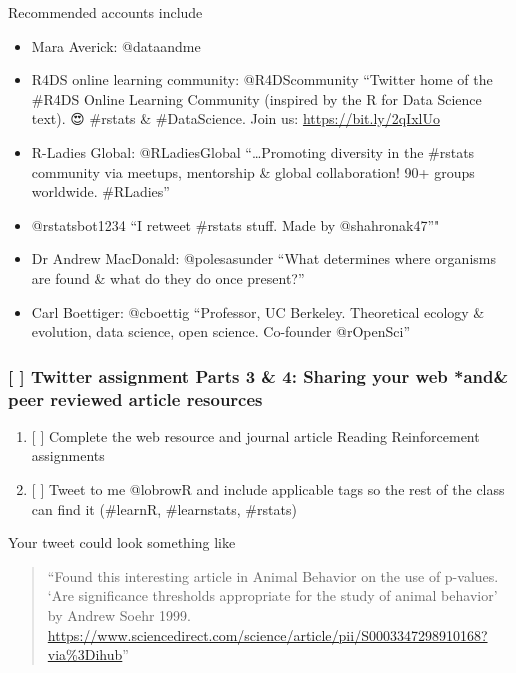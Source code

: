 \documentclass[]{article}
\providecommand{\tightlist}{%
  \setlength{\itemsep}{0pt}\setlength{\parskip}{0pt}}
\begin{document}
Recommended accounts include

\begin{itemize}
\tightlist
\item
  Mara Averick: @dataandme
\item
  R4DS online learning community: @R4DScommunity ``Twitter home of the
  \#R4DS Online Learning Community (inspired by the R for Data Science
  text). 😍 \#rstats \& \#DataScience. Join us:
  \url{https://bit.ly/2qIxlUo}
\item
  R-Ladies Global: @RLadiesGlobal ``\ldots{}Promoting diversity in the
  \#rstats community via meetups, mentorship \& global collaboration!
  90+ groups worldwide. \#RLadies''
\item
  @rstatsbot1234 ``I retweet \#rstats stuff. Made by @shahronak47''"
\item
  Dr Andrew MacDonald: @polesasunder ``What determines where organisms
  are found \& what do they do once present?''
\item
  Carl Boettiger: @cboettig ``Professor, UC Berkeley. Theoretical
  ecology \& evolution, data science, open science. Co-founder
  @rOpenSci''
\end{itemize}

\subsubsection{{[} {]} Twitter assignment Parts 3 \& 4: Sharing your web
*and\& peer reviewed article
resources}\label{twitter-assignment-parts-3-4-sharing-your-web-and-peer-reviewed-article-resources}

\begin{enumerate}
\def\labelenumi{\arabic{enumi}.}
\tightlist
\item
  {[} {]} Complete the web resource and journal article Reading
  Reinforcement assignments
\item
  {[} {]} Tweet to me @lobrowR and include applicable tags so the rest
  of the class can find it (\#learnR, \#learnstats, \#rstats)
\end{enumerate}

Your tweet could look something like

\begin{quote}
``Found this interesting article in Animal Behavior on the use of
p-values. `Are significance thresholds appropriate for the study of
animal behavior' by Andrew Soehr 1999.
\url{https://www.sciencedirect.com/science/article/pii/S0003347298910168?via\%3Dihub}''
\end{quote}
\end{document}
